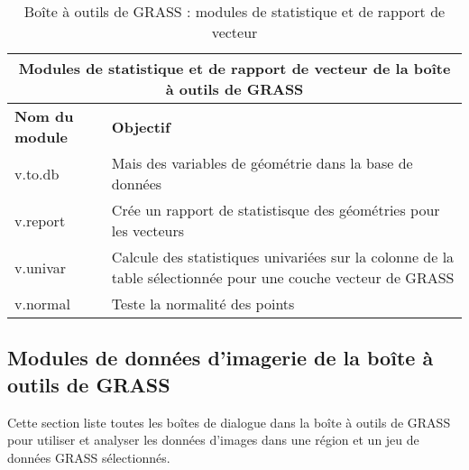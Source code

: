 \begin{table}[ht]
\centering
 \caption{Bo\^ite \`a outils de GRASS : modules de statistique et de rapport de vecteur}\medskip
 \begin{tabular}{|p{4cm}|p{12cm}|}
  \hline \multicolumn{2}{|c|}{\textbf{Modules de statistique et de rapport de vecteur de la bo\^ite \`a outils de GRASS}} \\
  \hline \textbf{Nom du module} & \textbf{Objectif} \\
  \hline v.to.db & Mais des variables de g\'eom\'etrie dans la base de donn\'ees\\
  \hline v.report & Cr\'ee un rapport de statistisque des g\'eom\'etries pour les vecteurs\\
  \hline v.univar & Calcule des statistiques univari\'ees sur la colonne de la table s\'electionn\'ee pour une couche vecteur de GRASS\\
  \hline v.normal & Teste la normalit\'e des points\\
\hline
\end{tabular}
\end{table}

\clearpage

\subsection{Modules de donn\'ees d'imagerie de la bo\^ite \`a outils de GRASS}

Cette section liste toutes les bo\^ites de dialogue dans la bo\^ite \`a outils de GRASS pour utiliser et analyser les donn\'ees d'images dans une r\'egion et un jeu de donn\'ees GRASS s\'electionn\'es.

